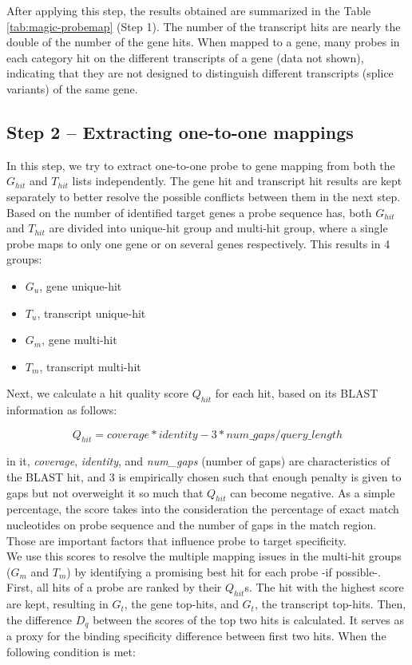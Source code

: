After applying this step, the results obtained are summarized in the Table 
\ref{tab:magic-probemap} (Step 1). 
The number of the transcript hits are nearly the double of the number of the 
gene hits.
When mapped to a gene, many probes in each category hit on the different 
transcripts of a gene (data not shown),
indicating that they are not designed to distinguish different 
transcripts (splice variants) of the same gene.

\subsection{Step 2 – Extracting one-to-one mappings}

In this step, we try to extract one-to-one probe to gene mapping from both the 
$G_{hit}$ and $T_{hit}$ lists independently. 
The gene hit and transcript hit results are kept separately to better resolve 
the possible conflicts between them in the next step. 
Based on the number of identified target genes a probe sequence has, both 
$G_{hit}$ and $T_{hit}$ are divided into unique-hit group and 
multi-hit group, where a single probe maps to only one gene or on several genes 
respectively. This results in 4 groups: 

\begin{itemize}
\item $G_u$, gene unique-hit
\item $T_u$, transcript unique-hit
\item $G_m$, gene multi-hit
\item $T_m$, transcript multi-hit
\end{itemize}

Next, we calculate a hit quality score $Q_{hit}$ for each hit, based on its 
BLAST information as follows:  

\begin{equation}
Q_{hit} = coverage * identity - 3 * num\_gaps / query\_length
\end{equation}

in it, \textit{coverage},  \textit{identity}, and \textit{num\_gaps} (number 
of gaps) are characteristics of the BLAST hit, 
and $3$ is empirically chosen such that enough penalty is given to gaps but not 
overweight it so much that $Q_{hit}$ can become negative. As a simple 
percentage, the score takes into the consideration the percentage of exact 
match nucleotides on probe sequence and the number of gaps in the match region. 
Those are important factors that influence probe to target specificity.  \\
We use this scores to resolve the multiple mapping issues in the multi-hit 
groups ($G_m$ and $T_m$) by identifying a promising best hit for each probe -if 
possible-.
First, all hits of a probe are ranked by their $Q_{hit}$s. The hit with the 
highest score are kept, resulting in $G_t$, the gene top-hits, and $G_t$, the 
transcript top-hits.
Then, the difference $D_q$ between the scores of the top two hits is 
calculated. 
It serves as a proxy for the binding specificity difference between first two 
hits. When the following condition is met: 

